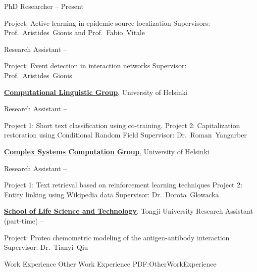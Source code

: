 \documentclass[letterpaper,MMMyyyy,nonstopmode]{simpleresumecv}
\begin{document}
\begin{Body}
\Gap
\BulletItem
PhD Researcher
\hfill
{} --
Present
\begin{Detail}
\SubBulletItem
Project:
Active learning in epidemic source localization
\SubBulletItem
Supervisors:
Prof.~Aristides~Gionis and
Prof.~Fabio~Vitale
\end{Detail}

\Gap
\BulletItem
Research Assistant
\hfill
{} --
\begin{Detail}
\SubBulletItem
Project:
Event detection in interaction networks
\SubBulletItem
Supervisor:
Prof.~Aristides~Gionis
\end{Detail}


\Entry
\href{}
{\textbf{Computational Linguistic Group}},
University of Helsinki

\Gap
\BulletItem
Research Assistant
\hfill
{} --
\begin{Detail}
\SubBulletItem
Project 1: Short text classification using co-training.
\SubBulletItem
Project 2: Capitalization restoration using Conditional Random Field
\SubBulletItem
Supervisor:
Dr.~Roman~Yangarber
\end{Detail}

\Entry
\href{}
{\textbf{Complex Systems Computation Group}},
University of Helsinki

\Gap
\BulletItem
Research Assistant
\hfill
{} --
\begin{Detail}
\SubBulletItem
Project 1: Text retrieval based on reinforcement learning techniques
\SubBulletItem
Project 2: Entity linking using Wikipedia data
\SubBulletItem
Supervisor:
Dr.~Dorota~Glowacka
\end{Detail}

\Entry
\href{}
{\textbf{School of Life Science and Technology}},
Tongji University
\Gap
\BulletItem
Research Assistant (part-time)
\hfill
{} --
\begin{Detail}
\SubBulletItem
Project: Proteo chemometric modeling of the antigen-antibody interaction
\SubBulletItem
Supervisor:
Dr.~Tianyi~Qiu
\end{Detail}


\Section
{Work
Experience}
{Other Work Experience}
{PDF:OtherWorkExperience}


\end{Body}
\end{document}
